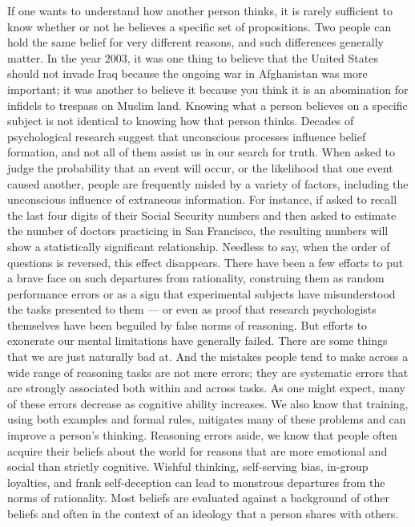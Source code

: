 \documentclass[a4paper,14pt]{extbook}
\begin{document}
If one wants to understand how another person thinks, it is rarely sufficient to know whether or not he believes a specific set of propositions.
Two people can hold the same belief for very different reasons, and such differences generally matter.
In the year 2003, it was one thing to believe that the United States should not invade Iraq because the ongoing war in Afghanistan was more important;
it was another to believe it because you think it is an abomination for infidels to trespass on Muslim land.
Knowing what a person believes on a specific subject is not identical to knowing how that person thinks.
Decades of psychological research suggest that unconscious processes influence belief formation, and not all of them assist us in our search for truth.
When asked to judge the probability that an event will occur, or the likelihood that one event caused another, people are frequently misled by a variety of factors, including the unconscious influence of extraneous information.
For instance, if asked to recall the last four digits of their Social Security numbers and then asked to estimate the number of doctors practicing in San Francisco, the resulting numbers will show a statistically significant relationship.
Needless to say, when the order of questions is reversed, this effect disappears.
There have been a few efforts to put a brave face on such departures from rationality, construing them as random performance errors or as a sign that experimental subjects have misunderstood the tasks presented to them --- or even as proof that research psychologists themselves have been beguiled by false norms of reasoning.
But efforts to exonerate our mental limitations have generally failed.
There are some things that we are just naturally bad at.
And the mistakes people tend to make across a wide range of reasoning tasks are not mere errors;
they are systematic errors that are strongly associated both within and across tasks.
As one might expect, many of these errors decrease as cognitive ability increases.
We also know that training, using both examples and formal rules, mitigates many of these problems and can improve a person’s thinking.
Reasoning errors aside, we know that people often acquire their beliefs about the world for reasons that are more emotional and social than strictly cognitive.
Wishful thinking, self-serving bias, in-group loyalties, and frank self-deception can lead to monstrous departures from the norms of rationality.
Most beliefs are evaluated against a background of other beliefs and often in the context of an ideology that a person shares with others.
\end{document}
